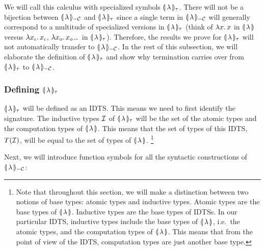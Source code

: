 We will call this calculus with specialized symbols
$\llparenthesis \, \lambda \, \rrparenthesis_\tau$. There will not be a bijection between ${\llparenthesis \, \lambda \, \rrparenthesis_{-\mathcal{C}}}$
and $\llparenthesis \, \lambda \, \rrparenthesis_\tau$ since a single term in ${\llparenthesis \, \lambda \, \rrparenthesis_{-\mathcal{C}}}$ will
generally correspond to a multitude of specialized versions in
$\llparenthesis \, \lambda \, \rrparenthesis_\tau$ (think of $\lambda x.\, x$ in $\llparenthesis \, \lambda \, \rrparenthesis$ versus
$\lambda x_\iota.\, x_\iota$, $\lambda x_o.\, x_o$\ldots\ in
$\llparenthesis \, \lambda \, \rrparenthesis_\tau$). Therefore, the results we prove for
$\llparenthesis \, \lambda \, \rrparenthesis_\tau$ will not automatically transfer to
${\llparenthesis \, \lambda \, \rrparenthesis_{-\mathcal{C}}}$. In the rest of this subsection, we will elaborate the
definition of $\llparenthesis \, \lambda \, \rrparenthesis_\tau$ and show why termination carries over
from $\llparenthesis \, \lambda \, \rrparenthesis_\tau$ to ${\llparenthesis \, \lambda \, \rrparenthesis_{-\mathcal{C}}}$.


\subsubsection{Defining $\llparenthesis \, \lambda \, \rrparenthesis_\tau$}
\label{sssec:banana-tau}

$\llparenthesis \, \lambda \, \rrparenthesis_\tau$ will be defined as an IDTS. This means we need to
first identify the signature. The inductive types $\mathcal{I}$ of
$\llparenthesis \, \lambda \, \rrparenthesis_\tau$ will be the set of the atomic types and the
computation types of ${\llparenthesis \, \lambda \, \rrparenthesis}$. This means that the set of types of this
IDTS, $T(\mathcal{I})$, will be equal to the set of types of ${\llparenthesis \, \lambda \, \rrparenthesis}$.
\footnote{Note that throughout this section, we will make a distinction
  between two notions of base types: atomic types and inductive
  types. Atomic types are the base types of ${\llparenthesis \, \lambda \, \rrparenthesis}$. Inductive types are
  the base types of IDTSs. In our particular IDTS, inductive types include
  the base types of ${\llparenthesis \, \lambda \, \rrparenthesis}$, i.e.\ the atomic types, and the computation
  types of ${\llparenthesis \, \lambda \, \rrparenthesis}$. This means that from the point of view of the IDTS,
  computation types are just another base type.}

Next, we will introduce function symbols for all the syntactic
constructions of ${\llparenthesis \, \lambda \, \rrparenthesis_{-\mathcal{C}}}$:

